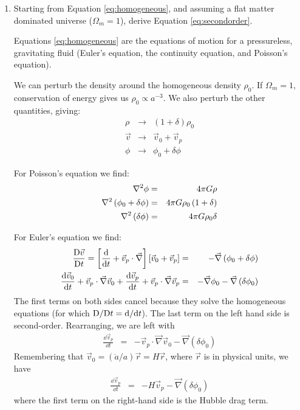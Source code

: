 \begin{enumerate}
\item Starting from Equation \ref{eq:homogeneous}, and assuming a flat
    matter dominated universe ($\Omega_m = 1$), derive
    Equation \ref{eq:secondorder}.

\begin{answer}
Equations \ref{eq:homogeneous} are the equations of motion for a
pressureless, gravitating fluid (Euler's equation, the continuity
equation, and Poisson's equation).

We can perturb the density around the homogeneous density $\rho_0$.
If $\Omega_m = 1$, conservation of energy gives us $\rho_0
\propto a^{-3}$. We also perturb the other quantities, giving:
\begin{eqnarray}
\rho  &\rightarrow& (1+\delta)\rho_0 \\
\vec{v} &\rightarrow& \vec{v}_0 + \vec{v}_p \\
\phi  &\rightarrow& \phi_0 + \delta\phi
\end{eqnarray}

For Poisson's equation we find:
\begin{eqnarray}
\nabla^2\phi &=& 4\pi G \rho  \cr
\nabla^2\left(\phi_0 + \delta\phi\right) &=& 4\pi
G \rho_0\left(1+\delta\right)  \cr
\nabla^2\left(\delta\phi\right) &=& 4\pi G \rho_0 \delta
\end{eqnarray}

For Euler's equation we find:
\begin{eqnarray}
\frac{{\rm D}\vec{v}}{{\rm D} t} =
\left[ \frac{{\rm d}}{{\rm d}t} + \vec{v}_p \cdot \vec{\nabla} \right]
\left[\vec{v}_0 + \vec{v}_p\right] &=& - \vec{\nabla}\left(\phi_0
+ \delta\phi\right) \cr
\frac{{\rm d}\vec{v}_0}{{\rm d}t} + \vec{v}_p \cdot \vec{\nabla}\vec{v}_0
+ \frac{{\rm d}\vec{v}_p}{{\rm d}t} + \vec{v}_p \cdot \vec{\nabla}\vec{v}_p
&=& - \vec{\nabla}\phi_0 - \vec{\nabla}\left(\delta\phi_0\right)
\end{eqnarray}
The first terms on both sides cancel because they solve the
homogeneous equations (for which ${\rm D}/{\rm D}t
= {\rm d}/{\rm d}t$). The last term on the left hand side is
second-order. Rearranging, we are left with
\begin{eqnarray}
\frac{\dd{\vec{v}_p}}{\dd{t}}
&=& - \vec{v}_p \cdot \vec{\nabla}\vec{v}_0
- \vec{\nabla}\left(\delta\phi_0\right)
\end{eqnarray}
Remembering that $\vec{v}_0 = ({\dot a}/a)\vec{r} = H\vec{r}$, where
$\vec{r}$ is in physical units, we have
\begin{eqnarray}
\label{eq:dvdt}
\frac{\dd{\vec{v}_p}}{\dd{t}}
&=&
- H \vec{v}_p
- \vec{\nabla}\left(\delta\phi_0\right)
\end{eqnarray}
where the first term on the right-hand side is the Hubble drag term.


\end{answer}
\end{enumerate}
